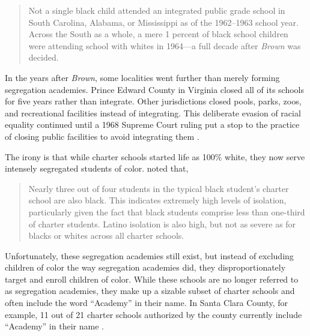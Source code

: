 \begin{quote}\OnehalfSpacing%
Not a single black child attended an integrated public grade school in South Carolina, Alabama, or Mississippi as of the 1962–1963 school year. Across the South as a whole, a mere 1 percent of black school children were attending school with whites in 1964—a full decade after \textit{Brown} was decided.
 \end{quote}

In the years after \textit{Brown}, some localities went further than merely forming segregation academies. Prince Edward County in Virginia closed all of its schools for five years rather than integrate. Other jurisdictions closed pools, parks, zoos, and recreational facilities instead of integrating. This deliberate evasion of racial equality continued until a 1968 Supreme Court ruling put a stop to the practice of closing public facilities to avoid integrating them  \parencite{Brennan1968}.

The irony is that while charter schools started life as 100\% white, they now serve intensely segregated students of color. \textcite{Frankenberg.etal2019} noted that,

\begin{quote}\OnehalfSpacing%
Nearly three out of four students in the typical black student's charter school are also black. This indicates extremely high levels of isolation, particularly given the fact that black students comprise less than one-third of charter students. Latino isolation is also high, but not as severe as for blacks or whites across all charter schools. 
\end{quote}

Unfortunately, these segregation academies still exist, but instead of excluding children of color the way segregation academies did, they disproportionately target and enroll children of color. While these schools are no longer referred to as segregation academies, they make up a sizable subset of charter schools and often include the word ``Academy'' in their name. In Santa Clara County, for example, 11 out of 21 charter schools authorized by the county currently include ``Academy'' in their name \parencite{SCCOE2021}.

